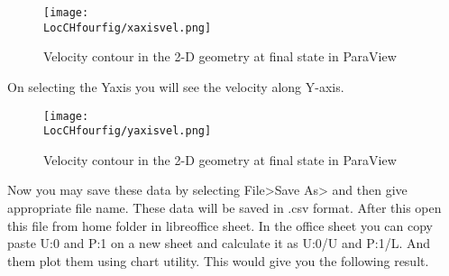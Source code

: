 \begin{figure}[ht]  
\begin{center}  
\texttt{[image: \\LocCHfourfig/xaxisvel.png]}
\caption{Velocity contour in the 2-D geometry at final state in ParaView}
\label{xaxisvel}
\end{center}  
\end{figure}

\flushleft On selecting the Yaxis you will see the velocity along Y-axis.

\begin{figure}[ht]  
\begin{center}  
\texttt{[image: \\LocCHfourfig/yaxisvel.png]}
\caption{Velocity contour in the 2-D geometry at final state in ParaView}
\label{yaxisvel}
\end{center}  
\end{figure}

\flushleft Now you may save these data by selecting File>Save As> and then give appropriate file name. These data will be saved in .csv format. After this open this file from home folder in libreoffice sheet. In the office sheet you can copy paste U:0 and P:1 on a new sheet and calculate it as U:0/U and P:1/L. And them plot them using chart utility. This would give you the following result.
